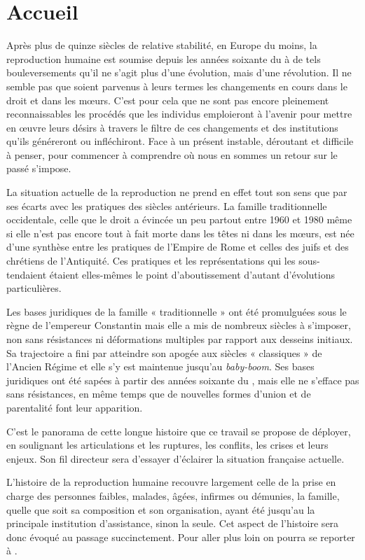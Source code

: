

\chapter{Accueil}


Après plus de quinze siècles de relative stabilité, en Europe du moins, la reproduction humaine
est soumise depuis les années soixante du  à de tels bouleversements
qu'il ne s'agit plus d'une évolution, mais d'une révolution. Il
ne semble pas que soient  parvenus à leurs termes les changements en
cours dans le droit et dans les mœurs. C'est pour cela que ne sont pas
encore pleinement reconnaissables les procédés que les individus emploieront
à l'avenir pour mettre en œuvre leurs désirs à travers le filtre
de ces changements et des institutions qu'ils généreront ou infléchiront.
Face à un présent instable, déroutant et difficile à penser, pour commencer à
comprendre où nous en sommes
 un retour sur le passé s'impose.

La situation actuelle de la reproduction ne prend en
effet tout son sens que par ses écarts avec les pratiques des siècles antérieurs.
La famille traditionnelle occidentale, celle que le droit a évincée un peu partout entre 1960 et
1980 même si elle n'est pas encore tout à fait morte dans les têtes ni dans les mœurs, est
née d'une synthèse entre les pratiques de l'Empire de Rome et celles des
juifs et des chrétiens de l'Antiquité. Ces pratiques et les représentations
qui les sous-tendaient étaient elles-mêmes le point d'aboutissement
d'autant d'évolutions particulières.

Les bases juridiques de la famille « traditionnelle » ont été promulguées sous le règne
de l'empereur Constantin mais elle a mis de nombreux
siècles à s'imposer, non sans résistances ni déformations multiples par
rapport aux desseins initiaux. Sa trajectoire a fini par atteindre son apogée aux
siècles « classiques » de l'Ancien Régime et elle s'y est maintenue jusqu'au
\emph{baby-boom}. Ses bases juridiques ont été sapées à partir des années soixante du , mais elle ne s'efface pas sans résistances, en même temps que de nouvelles formes d'union et de parentalité font leur apparition.

C'est le panorama de cette longue histoire que ce travail se propose de déployer, en soulignant les articulations et les ruptures, les
conflits, les crises et leurs enjeux. Son fil directeur sera d'essayer d'éclairer la situation française actuelle.

L'histoire de la reproduction humaine recouvre largement celle
de la prise en charge des personnes faibles, malades, âgées, infirmes ou
démunies, la famille, quelle que soit sa composition et son organisation, ayant été jusqu'au  la principale institution
d'assistance, sinon la seule. Cet aspect de l'histoire sera donc évoqué
au passage succinctement. Pour aller plus loin on
pourra se reporter à \cite{tigreat2010}.




